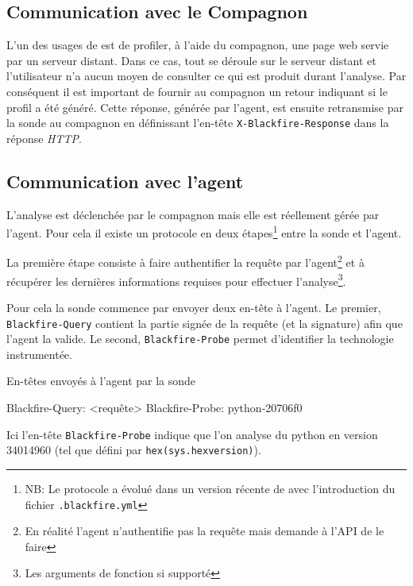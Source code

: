 			\subsection{Communication avec le Compagnon}
			\label{subsec:comm-compagnon}
L'un des usages de \Blackfire est de profiler, à l'aide du compagnon, une page web servie par un serveur distant. Dans ce cas, tout se déroule sur le serveur distant et l'utilisateur n'a aucun moyen de consulter ce qui est produit durant l'analyse. Par conséquent il est important de fournir au compagnon un retour indiquant si le profil a été généré. Cette réponse, générée par l'agent, est ensuite retransmise par la sonde au compagnon en définissant l'en-tête \verb|X-Blackfire-Response| dans la réponse \emph{HTTP}.

			\subsection{Communication avec l'agent}
			\label{subsec:comm-agent}
L'analyse est déclenchée par le compagnon mais elle est réellement gérée par l'agent. Pour cela il existe un protocole en deux étapes\footnote{NB: Le protocole a évolué dans un version récente de \Blackfire avec l'introduction du fichier \verb|.blackfire.yml|} entre la sonde et l'agent.

La première étape consiste à faire authentifier la requête par l'agent\footnote{En réalité l'agent n'authentifie pas la requête mais demande à l'API de le faire} et à récupérer les dernières informations requises pour effectuer l'analyse\footnote{Les arguments de fonction si supporté}.

Pour cela la sonde commence par envoyer deux en-tête à l'agent. Le premier, \verb|Blackfire-Query| contient la partie signée de la requête (et la signature) afin que l'agent la valide. Le second, \verb|Blackfire-Probe| permet d'identifier la technologie instrumentée.

\begin{listing}[H]
\caption{En-têtes envoyés à l'agent par la sonde}
\begin{textcode}
Blackfire-Query: <requête>
Blackfire-Probe: python-20706f0
\end{textcode}
\end{listing}
Ici l'en-tête  \verb|Blackfire-Probe| indique que l'on analyse du python en version 34014960 (tel que défini par \texttt{hex(sys.hexversion)}).

